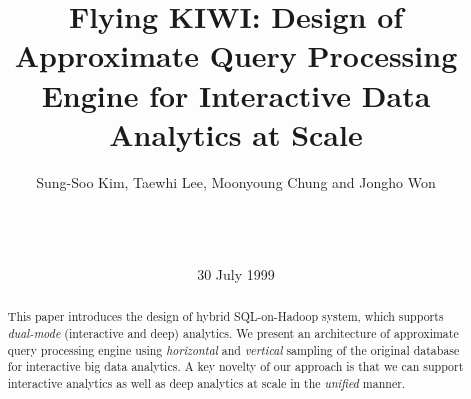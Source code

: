 \documentclass{sig-alternate-05-2015}
\begin{document}






%

\title{Flying KIWI: Design of Approximate Query Processing Engine for Interactive Data Analytics at Scale }


\author{
\alignauthor
Sung-Soo Kim, Taewhi Lee, Moonyoung Chung and Jongho Won \\
       \\
       \\
       \\
}

\date{30 July 1999}

\maketitle
\begin{abstract}
This paper introduces the design of hybrid SQL-on-Hadoop system, which supports \textit{dual-mode} (interactive and deep) analytics. %
We present an architecture of approximate query processing engine using \textit{horizontal} and \textit{vertical} sampling of the original database for interactive big data analytics. 
A key novelty of our approach is that we can support interactive analytics as well as deep analytics at scale in the \textit{unified} manner.
\end{abstract}
\end{document}
